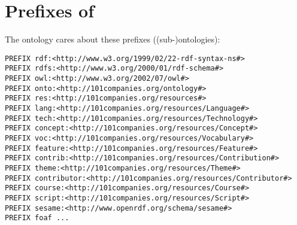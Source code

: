 
\section{Prefixes of \solasote}
\label{S:prefixes}

The ontology cares about these prefixes ((sub-)ontologies):

{\small

\begin{verbatim}
PREFIX rdf:<http://www.w3.org/1999/02/22-rdf-syntax-ns#>
PREFIX rdfs:<http://www.w3.org/2000/01/rdf-schema#>
PREFIX owl:<http://www.w3.org/2002/07/owl#>
PREFIX onto:<http://101companies.org/ontology#>
PREFIX res:<http://101companies.org/resources#>
PREFIX lang:<http://101companies.org/resources/Language#>
PREFIX tech:<http://101companies.org/resources/Technology#>
PREFIX concept:<http://101companies.org/resources/Concept#>
PREFIX voc:<http://101companies.org/resources/Vocabulary#>
PREFIX feature:<http://101companies.org/resources/Feature#>
PREFIX contrib:<http://101companies.org/resources/Contribution#>
PREFIX theme:<http://101companies.org/resources/Theme#>
PREFIX contributor:<http://101companies.org/resources/Contributor#>
PREFIX course:<http://101companies.org/resources/Course#>
PREFIX script:<http://101companies.org/resources/Script#>
PREFIX sesame:<http://www.openrdf.org/schema/sesame#>
PREFIX foaf ...
\end{verbatim}

}



